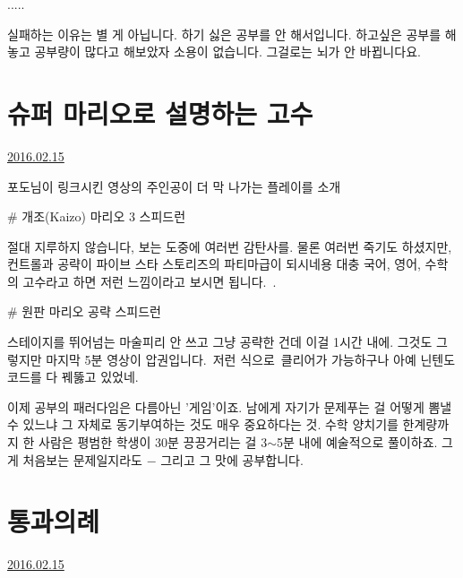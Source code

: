 .....
\vspace{5mm}

실패하는 이유는 별 게 아닙니다. 하기 싫은 공부를 안 해서입니다.
하고싶은 공부를 해놓고 공부량이 많다고 해보았자 소용이 없습니다. 그걸로는 뇌가 안 바뀝니다요.
\vspace{5mm}








\section{슈퍼 마리오로 설명하는 고수}
\href{https://www.kockoc.com/Apoc/636264}{2016.02.15}

\vspace{5mm}

포도님이 링크시킨 영상의 주인공이 더 막 나가는 플레이를 소개
\vspace{5mm}

$\#$ 개조(Kaizo) 마리오 3 스피드런
\vspace{5mm}

절대 지루하지 않습니다, 보는 도중에 여러번 감탄사를.
물론 여러번 죽기도 하셨지만, 컨트롤과 공략이 파이브 스타 스토리즈의 파티마급이 되시네용
대충 국어, 영어, 수학의 고수라고 하면 저런 느낌이라고 보시면 됩니다. .
\vspace{5mm}

$\#$ 원판 마리오 공략 스피드런
\vspace{5mm}

스테이지를 뛰어넘는 마술피리 안 쓰고 그냥 공략한 건데 이걸 1시간 내에.
그것도 그렇지만 마지막 5분 영상이 압권입니다. 저런 식으로 클리어가 가능하구나
아예 닌텐도 코드를 다 꿰뚫고 있었네.
\vspace{5mm}

이제 공부의 패러다임은 다름아닌 '게임'이죠.
남에게 자기가 문제푸는 걸 어떻게 뽐낼 수 있느냐 그 자체로 동기부여하는 것도 매우 중요하다는 것.
수학 양치기를 한계량까지 한 사람은
평범한 학생이 30분 끙끙거리는 걸 3$\sim$5분 내에 예술적으로 풀이하죠.
그게 처음보는 문제일지라도 $-$ 그리고 그 맛에 공부합니다.
\vspace{5mm}






\section{통과의례}
\href{https://www.kockoc.com/Apoc/636843}{2016.02.15}

